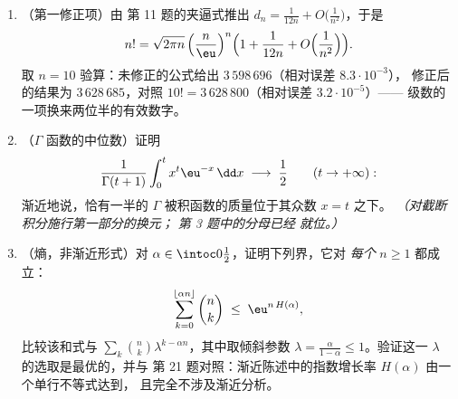 \begin{problem}
\begin{enumerate}[resume]
        证明 $s_{d-1} \to 0$ 同样快于任何几何速率——
        高维球面按任一欧几里得度量都是
        极其微小的。
  \item （第一修正项）由
        第 11 题的夹逼式推出 $d_n = \frac1{12n} +
        O\bigl(\frac1{n^2}\bigr)$，于是
        \[
        n! = \sqrt{2\pi n}\,\Bigl(\frac
        n\eu\Bigr)^{n}\Bigl(1 + \frac1{12n} +
        O\Bigl(\frac1{n^2}\Bigr)\Bigr).
        \]
        取 $n = 10$ 验算：未修正的公式给出
        $3\,598\,696$（相对误差 $8.3\cdot10^{-3}$），
        修正后的结果为 $3\,628\,685$，对照 $10! =
        3\,628\,800$（相对误差 $3.2\cdot10^{-5}$）——
        级数的一项换来两位半的有效数字。
  \item （$\Gamma$ 函数的中位数）证明
        \[
        \frac{1}{\Gamma(t+1)}
        \int_0^{t} x^{t}\eu^{-x}\,\dd x
        \;\longrightarrow\; \frac12
        \qquad (t \to +\infty) :
        \]
        渐近地说，恰有一半的
        $\Gamma$ 被积函数的质量位于其众数 $x = t$ 之下。
        \emph{（对截断积分施行第一部分的换元；
        第 3 题中的分母已经
        就位。）}
  \item （熵，非渐近形式）对 $\alpha \in
        \intoc0{\frac12}$，证明下列界，它对
        \emph{每个} $n \geq 1$ 都成立：
        \[
        \sum_{k=0}^{\lfloor\alpha n\rfloor}\binom nk
        \;\leq\; \eu^{n\,H(\alpha)} ,
        \]
        比较该和式与 $\sum_k\binom
        nk\lambda^{k-\alpha n}$，其中取倾斜参数 $\lambda =
        \frac{\alpha}{1-\alpha} \leq 1$。验证这一
        $\lambda$ 的选取是最优的，并与
        第 21 题对照：渐近陈述中的指数增长率 $H(\alpha)$
        由一个单行不等式达到，
        且完全不涉及渐近分析。
\end{enumerate}
\end{problem}
